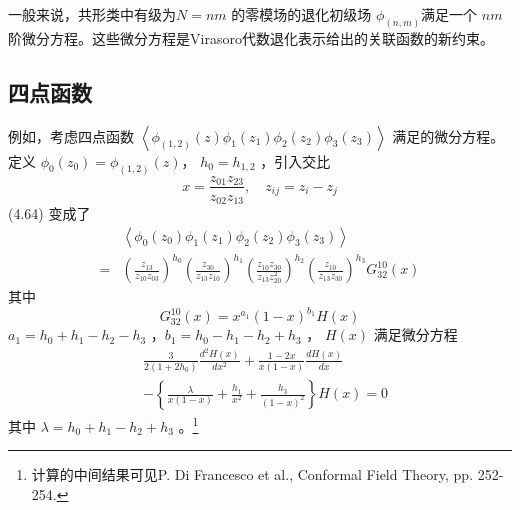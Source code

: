 一般来说，共形类中有级为$ N=nm$ 的零模场的退化初级场 $\phi_{(n, m)} $满足一个 $nm $阶微分方程。这些微分方程是Virasoro代数退化表示给出的关联函数的新约束。

\subsection{四点函数}
例如，考虑四点函数 $\left\langle\phi_{(1,2)}(z) \phi_{1}\left(z_{1}\right) \phi_{2}\left(z_{2}\right) \phi_{3}\left(z_{3}\right)\right\rangle$ 满足的微分方程。定义 $\phi_{0}\left(z_{0}\right)=\phi_{(1,2)}(z) $， $h_{0}=h_{1,2}$ ，引入交比
$$
x=\frac{z_{01} z_{23}}{z_{02} z_{13}}, \quad z_{i j}=z_{i}-z_{j}
$$
(4.64) 变成了
\begin{equation}
\begin{aligned} &\left\langle\phi_{0}\left(z_{0}\right) \phi_{1}\left(z_{1}\right) \phi_{2}\left(z_{2}\right) \phi_{3}\left(z_{3}\right)\right\rangle \\ =&\left(\frac{z_{13}}{z_{10} z_{03}}\right)^{h_{0}}\left(\frac{z_{30}}{z_{13} z_{10}}\right)^{h_{1}}\left(\frac{z_{10} z_{30}}{z_{13} z_{20}^{2}}\right)^{h_{2}}\left(\frac{z_{10}}{z_{13} z_{30}}\right)^{h_{3}} G_{32}^{10}(x) \end{aligned}
\end{equation}
其中
\begin{equation}
	G_{32}^{10}(x)=x^{a_{1}}(1-x)^{b_{1}} H(x) 
\end{equation}
$a_{1}=h_{0}+h_{1}-h_{2}-h_{3}$ ，$ b_{1}=h_{0}-h_{1}-h_{2}+h_{3}$ ， $H(x)$ 满足微分方程
\begin{equation}
\begin{aligned} &\frac{3}{2\left(1+2 h_{0}\right)} \frac{d^{2} H(x)}{d x^{2}}+\frac{1-2 x}{x(1-x)} \frac{d H(x)}{d x} \\& -\left\{\frac{\lambda}{x(1-x)}+\frac{h_{1}}{x^{2}}+\frac{h_{3}}{(1-x)^{2}}\right\} H(x)=0 \end{aligned}
\end{equation}
其中 $\lambda=h_{0}+h_{1}-h_{2}+h_{3}$ 。\footnote{计算的中间结果可见P. Di Francesco et al., Conformal Field Theory, pp. 252-254.}


